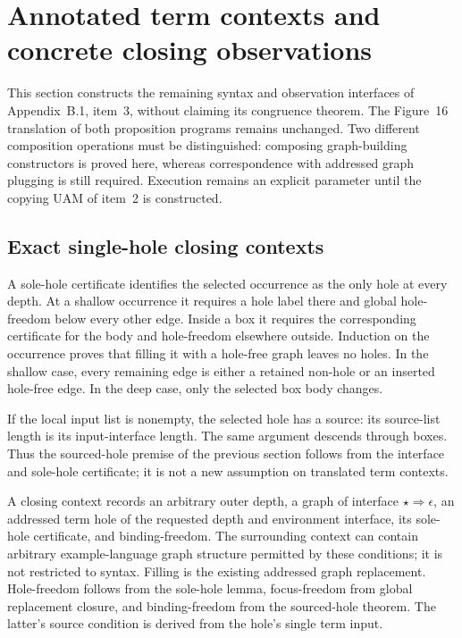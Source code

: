 \clearpage
\section{Annotated term contexts and concrete closing observations}
\label{sec:copying-observations}
This section constructs the remaining syntax and observation interfaces of
Appendix~B.1, item~3, without claiming its congruence theorem. The Figure~16
translation of both proposition programs remains unchanged. Two different
composition operations must be distinguished: composing graph-building
constructors is proved here, whereas correspondence with addressed graph
plugging is still required. Execution remains an explicit parameter until
the copying UAM of item~2 is constructed.

\subsection{Exact single-hole closing contexts}


A sole-hole certificate identifies the selected occurrence as the only hole
at every depth. At a shallow occurrence it requires a hole label there and
global hole-freedom below every other edge. Inside a box it requires the
corresponding certificate for the body and hole-freedom elsewhere outside.
Induction on the occurrence proves that filling it with a hole-free graph
leaves no holes. In the shallow case, every remaining edge is either a
retained non-hole or an inserted hole-free edge. In the deep case, only
the selected box body changes.

If the local input list is nonempty, the selected hole has a source: its
source-list length is its input-interface length. The same argument descends
through boxes. Thus the sourced-hole premise of the previous section follows
from the interface and sole-hole certificate; it is not a new assumption on
translated term contexts.







A closing context records an arbitrary outer depth, a graph of interface
$\star\Rightarrow\epsilon$, an addressed term hole of the requested depth
and environment interface, its sole-hole certificate, and binding-freedom.
The surrounding context can contain arbitrary example-language graph
structure permitted by these conditions; it is not restricted to syntax.
Filling is the existing addressed graph replacement. Hole-freedom follows
from the sole-hole lemma, focus-freedom from global replacement closure,
and binding-freedom from the sourced-hole theorem. The latter's source
condition is derived from the hole's single term input.

